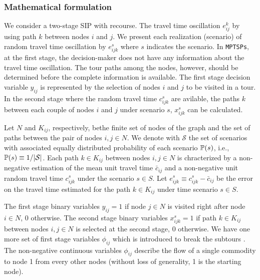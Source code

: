 \subsubsection{Mathematical formulation}
We consider a two-stage SIP with recourse. The travel time oscillation $e_{ij}^k$ by using path $k$ between nodes $i$ and $j$. We present each realization (scenario) of random travel time oscillation by $e_{ijk}^{s}$ where $s$ indicates the scenario. In \texttt{MPTSPs}, at the first stage, the decision-maker does not have any information about the travel time oscillation. The tour paths among the nodes, however, should be determined before the complete information is available. The first stage decision variable $y_{ij}$ is represented by the selection of nodes $i$ and $j$ to be visited in a tour. In the second stage where the random travel time $c_{ijk}^{s}$ are avilable, the paths $k$ between each couple of nodes $i$ and $j$ under scenario $s$, $x_{ijk}^{s}$ can be calculated. 

Let $N$ and $K_{ij}$, respectively, bethe finite set of nodes of the graph and the set of paths between the pair of nodes $i,j\in N$. We denote with $\mathcal{S}$ the set of scenarios with associated equally distributed probability of each scenario $\operatorname*{\mathbb{P}}(s)$, i.e., $\operatorname*{\mathbb{P}}(s)\equiv 1/|\mathcal{S}|$. Each path $k\in K_{ij}$ between nodes $i,j\in N$ is chracterized by a non-negative estimation of the mean unit travel time $\bar{c}_{ij}$ and a non-negative unit random travel time $c_{ijk}^{s}$ under the scenario $s\in S$. Let $e_{ijk}^{s}\equiv c_{ijk}^{s}-\bar{c}_{ij}$ be the error on the travel time estimated for the path $k\in K_{ij}$ under time scenario $s\in S$.

The first stage binary variables $y_{ij}=1$ if node $j\in N$ is visited right after node $i\in N$, 0 otherwise. The second stage binary variables $x_{ijk}^{s}=1$ if path $k\in K_{ij}$ between nodes $i,j\in N$ is selected at the second stage, 0 otherwise. We have one more set of first stage variables $\phi_{ij}$ which is introduced to break the subtours \cite{journal:LSD1990}. The non-negative continuous variables $\phi_{ij}$ describe the flow of a single commodity to node 1 from every other nodes (without loss of generality, 1 is the starting node). 


